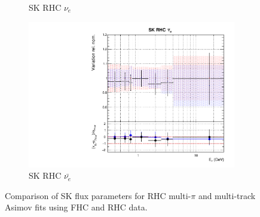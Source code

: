 \begin{figure}[t]
\begin{subfigure}{0.42\textwidth}
  \caption{SK RHC $\nu_{e}$}
\end{subfigure}
\begin{subfigure}{0.42\textwidth}
  \centering
  \includegraphics[width=0.75\linewidth]{figs/rhcmpasmvflux15}
  \caption{SK RHC $\bar{\nu_e}$}
\end{subfigure}
\caption{Comparison of SK flux parameters for RHC multi-$\pi$ and multi-track Asimov fits using FHC and RHC data.}
\label{fig:rhcmpiasmvSK}
\end{figure}

